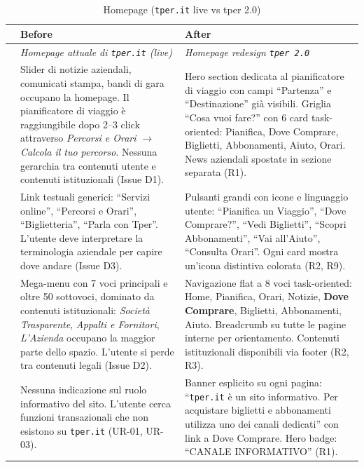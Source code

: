 \begin{table}[H]
\centering
\small
\renewcommand{\arraystretch}{1.4}
\begin{tabular}{|p{0.5cm}|p{7cm}|p{7cm}|}
\hline
& \textbf{Before} & \textbf{After} \\ \hline
\cellcolor{primaryColor!15} &
\textit{Homepage attuale di \texttt{tper.it} (live)} &
\textit{Homepage redesign \texttt{tper 2.0}} \\ \hline

\raisebox{0.5cm}{\rotatebox{90}{\textbf{Contenuti}}} &
Slider di notizie aziendali, comunicati stampa, bandi di gara occupano la homepage. Il pianificatore di viaggio è raggiungibile dopo 2--3 click attraverso \textit{Percorsi e Orari} $\rightarrow$ \textit{Calcola il tuo percorso}. Nessuna gerarchia tra contenuti utente e contenuti istituzionali (Issue D1). &
Hero section dedicata al pianificatore di viaggio con campi ``Partenza'' e ``Destinazione'' già visibili. Griglia ``Cosa vuoi fare?'' con 6 card task-oriented: Pianifica, Dove Comprare, Biglietti, Abbonamenti, Aiuto, Orari. News aziendali spostate in sezione separata (R1). \\ \hline

\raisebox{0.5cm}{\rotatebox{90}{\textbf{CTA}}} &
Link testuali generici: ``Servizi online'', ``Percorsi e Orari'', ``Biglietteria'', ``Parla con Tper''. L'utente deve interpretare la terminologia aziendale per capire dove andare (Issue D3). &
Pulsanti grandi con icone e linguaggio utente: ``Pianifica un Viaggio'', ``Dove Comprare?'', ``Vedi Biglietti'', ``Scopri Abbonamenti'', ``Vai all'Aiuto'', ``Consulta Orari''. Ogni card mostra un'icona distintiva colorata (R2, R9). \\ \hline

\raisebox{0.5cm}{\rotatebox{90}{\textbf{Navigazione}}} &
Mega-menu con 7 voci principali e oltre 50 sottovoci, dominato da contenuti istituzionali: \textit{Società Trasparente}, \textit{Appalti e Fornitori}, \textit{L'Azienda} occupano la maggior parte dello spazio. L'utente si perde tra contenuti legali (Issue D2). &
Navigazione flat a 8 voci task-oriented: Home, Pianifica, Orari, Notizie, \textbf{Dove Comprare}, Biglietti, Abbonamenti, Aiuto. Breadcrumb su tutte le pagine interne per orientamento. Contenuti istituzionali disponibili via footer (R2, R3). \\ \hline

\raisebox{0.5cm}{\rotatebox{90}{\textbf{Info}}} &
Nessuna indicazione sul ruolo informativo del sito. L'utente cerca funzioni transazionali che non esistono su \texttt{tper.it} (UR-01, UR-03). &
Banner esplicito su ogni pagina: ``\texttt{tper.it} è un sito informativo. Per acquistare biglietti e abbonamenti utilizza uno dei canali dedicati'' con link a Dove Comprare. Hero badge: ``CANALE INFORMATIVO'' (R1). \\ \hline
\end{tabular}
\caption{Homepage (\texttt{tper.it} live vs tper 2.0)}
\label{tab:comparison-home}
\end{table}

